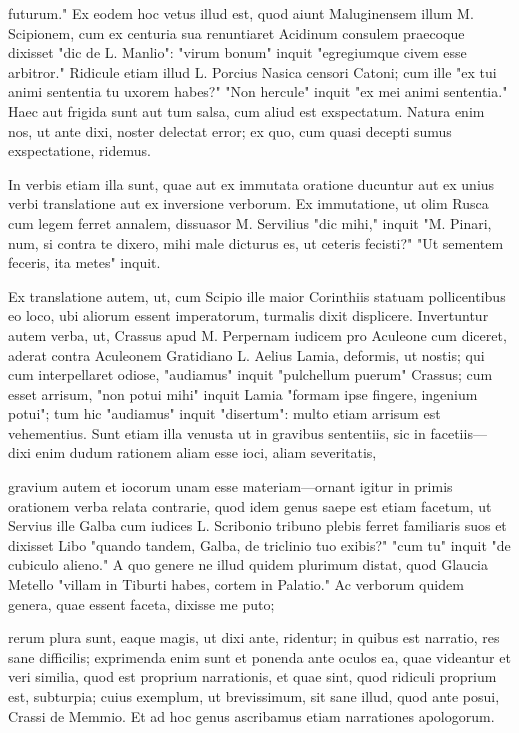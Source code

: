  futurum." Ex eodem hoc vetus illud est, quod aiunt Maluginensem illum M. Scipionem, cum ex centuria sua renuntiaret Acidinum consulem praecoque dixisset "dic de L. Manlio": "virum bonum" inquit "egregiumque civem esse arbitror." Ridicule etiam illud L. Porcius Nasica censori Catoni; cum ille "ex tui animi sententia tu uxorem habes?" "Non hercule" inquit "ex mei animi sententia." Haec aut frigida sunt aut tum salsa, cum aliud est exspectatum. Natura enim nos, ut ante dixi, noster delectat error; ex quo, cum quasi decepti sumus exspectatione, ridemus.

 In verbis etiam illa sunt, quae aut ex immutata oratione ducuntur aut ex unius verbi translatione aut ex inversione verborum. Ex immutatione, ut olim Rusca cum legem ferret annalem, dissuasor M. Servilius "dic mihi," inquit "M. Pinari, num, si contra te dixero, mihi male dicturus es, ut ceteris fecisti?" "Ut sementem feceris, ita metes" inquit.

 Ex translatione autem, ut, cum Scipio ille maior Corinthiis statuam pollicentibus eo loco, ubi aliorum essent imperatorum, turmalis dixit displicere. Invertuntur autem verba, ut, Crassus apud M. Perpernam iudicem pro Aculeone cum diceret, aderat contra Aculeonem Gratidiano L. Aelius Lamia, deformis, ut nostis; qui cum interpellaret odiose, "audiamus" inquit "pulchellum puerum" Crassus; cum esset arrisum, "non potui mihi" inquit Lamia "formam ipse fingere, ingenium potui"; tum hic "audiamus" inquit "disertum": multo etiam arrisum est vehementius. Sunt etiam illa venusta ut in gravibus sententiis, sic in facetiis— dixi enim dudum rationem aliam esse ioci, aliam severitatis,

 gravium autem et iocorum unam esse materiam—ornant igitur in primis orationem verba relata contrarie, quod idem genus saepe est etiam facetum, ut Servius ille Galba cum iudices L. Scribonio tribuno plebis ferret familiaris suos et dixisset Libo "quando tandem, Galba, de triclinio tuo exibis?" "cum tu" inquit "de cubiculo alieno." A quo genere ne illud quidem plurimum distat, quod Glaucia Metello "villam in Tiburti habes, cortem in Palatio." Ac verborum quidem genera, quae essent faceta, dixisse me puto;

 rerum plura sunt, eaque magis, ut dixi ante, ridentur; in quibus est narratio, res sane difficilis; exprimenda enim sunt et ponenda ante oculos ea, quae videantur et veri similia, quod est proprium narrationis, et quae sint, quod ridiculi proprium est, subturpia; cuius exemplum, ut brevissimum, sit sane illud, quod ante posui, Crassi de Memmio. Et ad hoc genus ascribamus etiam narrationes apologorum.

